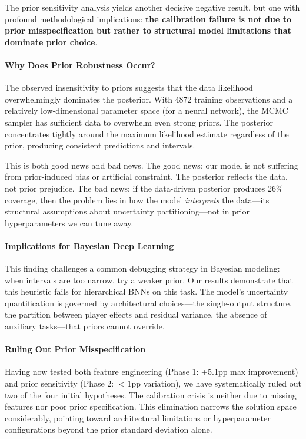 The prior sensitivity analysis yields another decisive negative result, but one with profound methodological implications: \textbf{the calibration failure is not due to prior misspecification but rather to structural model limitations that dominate prior choice}.

\paragraph{Why Does Prior Robustness Occur?}

The observed insensitivity to priors suggests that the data likelihood overwhelmingly dominates the posterior. With 4872 training observations and a relatively low-dimensional parameter space (for a neural network), the MCMC sampler has sufficient data to overwhelm even strong priors. The posterior concentrates tightly around the maximum likelihood estimate regardless of the prior, producing consistent predictions and intervals.

This is both good news and bad news. The good news: our model is not suffering from prior-induced bias or artificial constraint. The posterior reflects the data, not prior prejudice. The bad news: if the data-driven posterior produces 26\% coverage, then the problem lies in how the model \textit{interprets} the data—its structural assumptions about uncertainty partitioning—not in prior hyperparameters we can tune away.

\paragraph{Implications for Bayesian Deep Learning}

This finding challenges a common debugging strategy in Bayesian modeling: when intervals are too narrow, try a weaker prior. Our results demonstrate that this heuristic fails for hierarchical BNNs on this task. The model's uncertainty quantification is governed by architectural choices—the single-output structure, the partition between player effects and residual variance, the absence of auxiliary tasks—that priors cannot override.

\paragraph{Ruling Out Prior Misspecification}

Having now tested both feature engineering (Phase 1: +5.1pp max improvement) and prior sensitivity (Phase 2: $<1$pp variation), we have systematically ruled out two of the four initial hypotheses. The calibration crisis is neither due to missing features nor poor prior specification. This elimination narrows the solution space considerably, pointing toward architectural limitations or hyperparameter configurations beyond the prior standard deviation alone.


